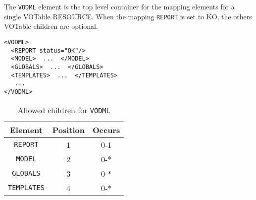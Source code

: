 The \texttt{VODML} element is the top level container for the mapping elements for a single VOTable RESOURCE.
When the mapping \texttt{REPORT} is set to KO, the others  VOTable children are optional.

\begin{lstlisting}[frame=single,caption={Example \texttt{VODML} mapping block},style=XML,basicstyle=\tiny]
<VODML>
  <REPORT status="OK"/>
  <MODEL>  ...  </MODEL>
  <GLOBALS>  ...  </GLOBALS>
  <TEMPLATES>  ...  </TEMPLATES>
   ...
</VODML>
\end{lstlisting}

\begin{table}[!htbp]
  \small
  \centering
  \begin{tabulary}{\linewidth}{|c |c |c|}
    \hline 
        \textbf{Element} &
        \textbf{Position} &
        \textbf{Occurs}\\
    \hline
    \hline  
      \texttt{REPORT} &           
      1 &           
      0-1\\
    \hline  
      \texttt{MODEL} &           
      2 &           
      0-*\\
    \hline    
      \texttt{GLOBALS} &           
      3 &           
      0-*\\
    \hline  
      \texttt{TEMPLATES} &           
      4 &           
      0-*\\
    \hline 
  \end{tabulary}
    \caption{Allowed children for \texttt{VODML}} 
    \label{tbl:vodml-children}
\end{table}


